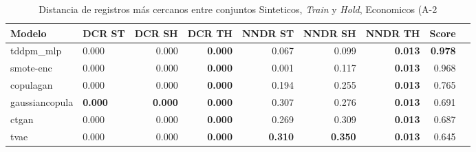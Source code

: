 \begin{table}[H]
\centering
\caption{Distancia de registros más cercanos entre conjuntos Sinteticos, \emph{Train} y \emph{Hold}, Economicos (A-2}
\label{table-dcr-economicos-a-2}
\begin{tabular}{|l|l|r|r|r|r|r|r|r|}
\hline
\rowcolor[gray]{0.8}
Modelo & DCR ST & DCR SH & DCR TH & NNDR ST & NNDR SH & NNDR TH & \textbf{Score} \\
\hline tddpm\_mlp & 0.000 & \cellcolor[rgb]{0.9, 0.54, 0.52} 0.000 & \bfseries 0.000 & 0.067 & 0.099 & \bfseries 0.013 & \bfseries 0.978 \\
\hline smote-enc & \cellcolor[rgb]{0.9, 0.54, 0.52} 0.000 & 0.000 & \bfseries 0.000 & 0.001 & 0.117 & \bfseries 0.013 & 0.968 \\
\hline copulagan & 0.000 & 0.000 & \bfseries 0.000 & 0.194 & 0.255 & \bfseries 0.013 & 0.765 \\
\hline gaussiancopula & \bfseries 0.000 & \bfseries 0.000 & \bfseries 0.000 & 0.307 & 0.276 & \bfseries 0.013 & 0.691 \\
\hline ctgan & 0.000 & 0.000 & \bfseries 0.000 & 0.269 & 0.309 & \bfseries 0.013 & 0.687 \\
\hline tvae & 0.000 & 0.000 & \bfseries 0.000 & \bfseries 0.310 & \bfseries 0.350 & \bfseries 0.013 & 0.645 \\
\hline
\end{tabular}
\end{table}
